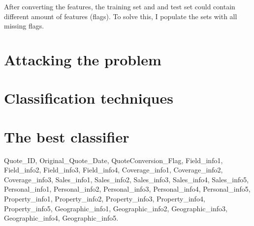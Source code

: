 

After converting the features, the training set and and test set could contain different amount of features (flags). To solve this, I populate the sets with all missing flags.




\section{Attacking the problem}

\section{Classification techniques}



\section{The best classifier}






 Quote\_ID, Original\_Quote\_Date, QuoteConversion\_Flag, Field\_info1, Field\_info2, Field\_info3, Field\_info4, Coverage\_info1, Coverage\_info2, Coverage\_info3, Sales\_info1, Sales\_info2, Sales\_info3, Sales\_info4, Sales\_info5, Personal\_info1, Personal\_info2, Personal\_info3, Personal\_info4, Personal\_info5, Property\_info1, Property\_info2, Property\_info3, Property\_info4, Property\_info5, Geographic\_info1, Geographic\_info2, Geographic\_info3, Geographic\_info4, Geographic\_info5.